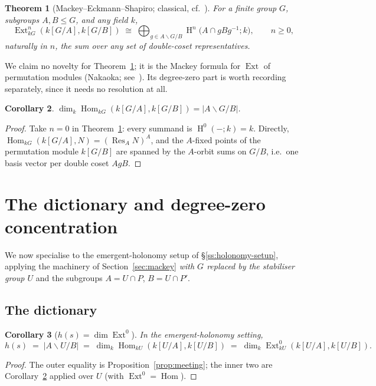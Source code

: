 \documentclass[11pt]{amsart}
\theoremstyle{plain}
\newtheorem{theorem}{Theorem}
\newtheorem{corollary}[theorem]{Corollary}
\theoremstyle{definition}
\DeclareMathOperator{\Res}{Res}
\DeclareMathOperator{\Hom}{Hom}
\DeclareMathOperator{\Ext}{Ext}
\DeclareMathOperator{\Hh}{H}
\newcommand{\dcoset}[3]{#1\backslash #2/#3}
\begin{document}
\begin{theorem}[Mackey--Eckmann--Shapiro; classical, cf.~{\cite[\S3]{benson1}}]\label{thm:mackey-ext}
For a finite group $G$, subgroups $A,B\le G$, and any field $k$,
\[
   \Ext^n_{kG}(k[G/A],k[G/B])\;\cong\;
   \bigoplus_{g\in\dcoset{A}{G}{B}}\Hh^n\!\bigl(A\cap gBg^{-1};k\bigr),
   \qquad n\ge 0,
\]
naturally in $n$, the sum over any set of double-coset representatives.
\end{theorem}

We claim no novelty for Theorem~\ref{thm:mackey-ext}; it is the Mackey formula for $\Ext$
of permutation modules (Nakaoka; see~\cite[\S3]{benson1}). Its degree-zero part is worth
recording separately, since it needs no resolution at all.

\begin{corollary}\label{cor:hom-doublecoset}
$\dim_k\Hom_{kG}(k[G/A],k[G/B])=\lvert\dcoset{A}{G}{B}\rvert$.
\end{corollary}
\begin{proof}
Take $n=0$ in Theorem~\ref{thm:mackey-ext}: every summand is $\Hh^0(-;k)=k$. Directly,
$\Hom_{kG}(k[G/A],N)=(\Res_A N)^A$, and the $A$-fixed points of the permutation module
$k[G/B]$ are spanned by the $A$-orbit sums on $G/B$, i.e.\ one basis vector per double
coset $AgB$.
\end{proof}

\section{The dictionary and degree-zero concentration}\label{sec:dictionary}

We now specialise to the emergent-holonomy setup of \S\ref{ss:holonomy-setup}, applying the
machinery of Section~\ref{sec:mackey} \emph{with $G$ replaced by the stabiliser group $U$}
and the subgroups $A=U\cap P$, $B=U\cap P'$.

\subsection{The dictionary}
\begin{corollary}[$h(s)=\dim\Ext^0$]\label{cor:dictionary}
In the emergent-holonomy setting,
\[
   h(s)\;=\;\lvert\dcoset{A}{U}{B}\rvert
       \;=\;\dim_k\Hom_{kU}(k[U/A],k[U/B])
       \;=\;\dim_k\Ext^0_{kU}(k[U/A],k[U/B]).
\]
\end{corollary}
\begin{proof}
The outer equality is Proposition~\ref{prop:meeting}; the inner two are
Corollary~\ref{cor:hom-doublecoset} applied over $U$ (with $\Ext^0=\Hom$).
\end{proof}
\end{document}
